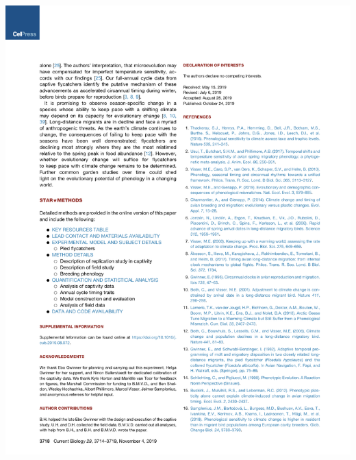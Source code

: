 \documentclass[a4paper, twoside]{templates/ociamthesis}
\begin{document}
\begin{center}\includegraphics[width=1\linewidth]{pdf_chapters/pied/pied_crop_Part05} \end{center}
\end{document}
